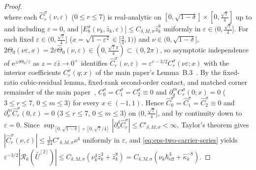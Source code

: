 \documentclass[11pt]{article}
\theoremstyle{definition}
\theoremstyle{remark}
\newcommand{\ii}{\mathrm{i}}
\newcommand{\cR}{\mathcal{R}}
\newcommand{\heff}{\hbar_{\mathrm{eff}}}
\renewcommand{\_}{\oldunderscore\penalty0\hskip0pt\relax}
\begin{document}
\begin{proof}
\begin{equation}
  \label{eq:eps-two-carrier-series}
\end{equation}
where each $\widehat{C}_r^\sigma(\nu,\varepsilon)$ ($0\le r\le 7$) is real-analytic on
  $[0,\sqrt{1-\delta}]\times[0,\frac{\sqrt{7}}{4}]$ up to and including $\varepsilon=0$, and
  $|E_8^\sigma(\nu_k,\hat{z}_k,\varepsilon)|\le C_{\delta,M,\sigma}\hat{z}_k^8$ uniformly in
  $\varepsilon\in(0,\frac{\sqrt{7}}{4}]$. For each fixed $\varepsilon\in(0,\frac{\sqrt{7}}{4}]$
  ($x=\sqrt{1-\varepsilon^2}\in[\frac34,1)$) and $\nu\in(0,\sqrt{1-\delta}]$,
  $2\Theta_0(\nu\varepsilon,x)=2\varepsilon\widehat{\Theta}_0(\nu,\varepsilon)\in(0,\frac{\sqrt{7}\pi}{4})\subset(0,2\pi)$, so
  asymptotic independence of $\mathrm{e}^{\pm\ii\Theta_0/z}$ as $z=\varepsilon\hat{z}\to 0^+$ identifies
  $\widehat{C}_r^\sigma(\nu,\varepsilon)=\varepsilon^{r-3/2}C_r^\sigma(\nu\varepsilon;x)$ with the interior coefficients
  $C_r^\sigma(q;x)$ of the main paper's Lemma~B.3~\cite[Eq.~(236)]{LewisGrowingRank}. By the fixed-ratio
  cubic-residual lemma, fixed-rank second-order contact, and matched corner remainder of the main paper~\cite{LewisGrowingRank},
  $C_0^\sigma=C_1^\sigma=C_2^\sigma\equiv 0$ and $\partial_q^m C_r^\sigma(0;x)=0$ ($3\le r\le 7$, $0\le m\le 3$) for every
  $x\in(-1,1)$. Hence $\widehat{C}_0^\sigma=\widehat{C}_1^\sigma=\widehat{C}_2^\sigma\equiv 0$ and
  $\partial_\nu^m\widehat{C}_r^\sigma(0,\varepsilon)=0$ ($3\le r\le 7$, $0\le m\le 3$) on $(0,\frac{\sqrt{7}}{4}]$, and by
  continuity down to $\varepsilon=0$. Since
  $\sup_{[0,\sqrt{1-\delta}]\times[0,\sqrt{7}/4]}|\partial_\nu^4\widehat{C}_r^\sigma|\le C'_{\delta,M,\sigma}<\infty$, Taylor's
  theorem gives $|\widehat{C}_r^\sigma(\nu,\varepsilon)|\le\frac{1}{24}C'_{\delta,M,\sigma}\nu^4$ uniformly in $\varepsilon$, and
  \eqref{eq:eps-two-carrier-series} yields $\varepsilon^{-3/2}|\cR_k(\stackrel{\circ}{U}^{[2]})|\le
  C_{\delta,M,\sigma}(\nu_k^4\hat{z}_k^3+\hat{z}_k^8)=C_{\delta,M,\sigma}(\nu_k\heff^3+\hat{\kappa}_k^{-8})$.
\end{proof}
\end{document}
